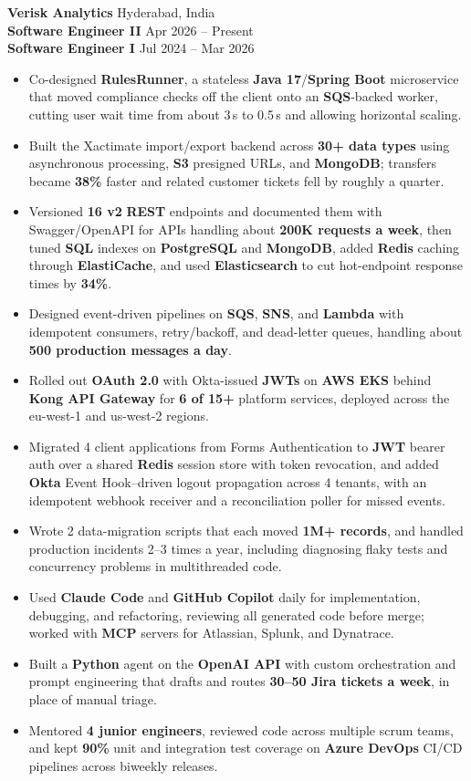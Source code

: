 \documentclass[a4paper,10pt]{article}
\begin{document}
\textbf{Verisk Analytics} \hfill Hyderabad, India \\
\textbf{Software Engineer II} \hfill Apr 2026 -- Present \\
\textbf{Software Engineer I} \hfill Jul 2024 -- Mar 2026

\begin{itemize}[leftmargin=*]
    \item Co-designed \textbf{RulesRunner}, a stateless \textbf{Java 17}/\textbf{Spring Boot} microservice that moved compliance checks off the client onto an \textbf{SQS}-backed worker, cutting user wait time from about 3\,s to 0.5\,s and allowing horizontal scaling.
    \item Built the Xactimate import/export backend across \textbf{30+ data types} using asynchronous processing, \textbf{S3} presigned URLs, and \textbf{MongoDB}; transfers became \textbf{38\%} faster and related customer tickets fell by roughly a quarter.
    \item Versioned \textbf{16 v2} \textbf{REST} endpoints and documented them with Swagger/OpenAPI for APIs handling about \textbf{200K requests a week}, then tuned \textbf{SQL} indexes on \textbf{PostgreSQL} and \textbf{MongoDB}, added \textbf{Redis} caching through \textbf{ElastiCache}, and used \textbf{Elasticsearch} to cut hot-endpoint response times by \textbf{34\%}.
    \item Designed event-driven pipelines on \textbf{SQS}, \textbf{SNS}, and \textbf{Lambda} with idempotent consumers, retry/backoff, and dead-letter queues, handling about \textbf{500 production messages a day}.
    \item Rolled out \textbf{OAuth 2.0} with Okta-issued \textbf{JWTs} on \textbf{AWS EKS} behind \textbf{Kong API Gateway} for \textbf{6 of 15+} platform services, deployed across the eu-west-1 and us-west-2 regions.
    \item Migrated 4 client applications from Forms Authentication to \textbf{JWT} bearer auth over a shared \textbf{Redis} session store with token revocation, and added \textbf{Okta} Event Hook--driven logout propagation across 4 tenants, with an idempotent webhook receiver and a reconciliation poller for missed events.
    \item Wrote 2 data-migration scripts that each moved \textbf{1M+ records}, and handled production incidents 2--3 times a year, including diagnosing flaky tests and concurrency problems in multithreaded code.
    \item Used \textbf{Claude Code} and \textbf{GitHub Copilot} daily for implementation, debugging, and refactoring, reviewing all generated code before merge; worked with \textbf{MCP} servers for Atlassian, Splunk, and Dynatrace.
    \item Built a \textbf{Python} agent on the \textbf{OpenAI API} with custom orchestration and prompt engineering that drafts and routes \textbf{30--50 Jira tickets a week}, in place of manual triage.
    \item Mentored \textbf{4 junior engineers}, reviewed code across multiple scrum teams, and kept \textbf{90\%} unit and integration test coverage on \textbf{Azure DevOps} CI/CD pipelines across biweekly releases.
\end{itemize}
\end{document}
